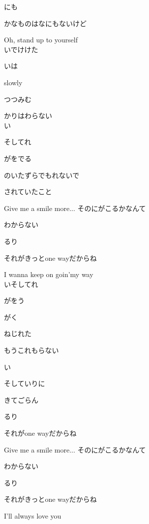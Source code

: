 {にも

かなものはなにもないけど

Oh, stand up to yourself
\\

いでけけた

いは

slowly

つつみむ

かりはわらない
\\

い

そしてれ

がをでる

のいたずらでもれないで

されていたこと

Give me a smile more... そのにがこるかなんて

わからない

るり

それがきっとone wayだからね

I wanna keep on goin'my way
\\

いそしてれ

がをう

がく

ねじれた

もうこれもらない

い

そしていりに

きてごらん

るり

それがone wayだからね

Give me a smile more... そのにがこるかなんて

わからない

るり

それがきっとone wayだからね

I'll always love you

}